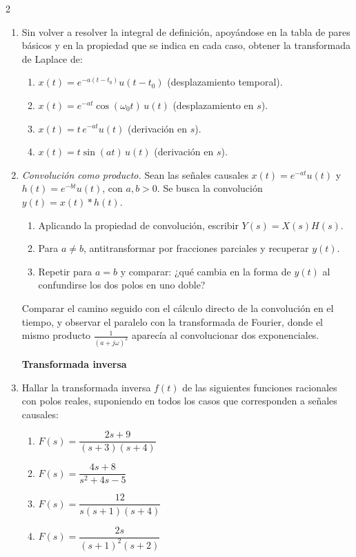 \documentclass[10pt,a4paper]{article}
\begin{document}
\begin{multicols}{2}
\begin{enumerate}
			\textbf{Propiedades}
			\item Sin volver a resolver la integral de definición, apoyándose en la tabla de pares básicos y en la propiedad que se indica en cada caso, obtener la transformada de Laplace de:
			\begin{enumerate}
				\item $x(t) = e^{-a(t-t_0)}u(t-t_0)$ \hfill (desplazamiento temporal).
				\item $x(t) = e^{-at}\cos(\omega_0 t)\,u(t)$ \hfill (desplazamiento en $s$).
				\item $x(t) = t\,e^{-at}u(t)$ \hfill (derivación en $s$).
				\item $x(t) = t\sin(at)\,u(t)$ \hfill (derivación en $s$).
			\end{enumerate}

			\item \emph{Convolución como producto.} Sean las señales causales $x(t) = e^{-at}u(t)$ y $h(t) = e^{-bt}u(t)$, con $a, b > 0$. Se busca la convolución $y(t) = x(t) * h(t)$.
			\begin{enumerate}
				\item Aplicando la propiedad de convolución, escribir $Y(s) = X(s)H(s)$.
				\item Para $a \neq b$, antitransformar por fracciones parciales y recuperar $y(t)$.
				\item Repetir para $a = b$ y comparar: ¿qué cambia en la forma de $y(t)$ al confundirse los dos polos en uno doble?
			\end{enumerate}
			Comparar el camino seguido con el cálculo directo de la convolución en el tiempo, y observar el paralelo con la transformada de Fourier, donde el mismo producto $\frac{1}{(a+j\omega)^2}$ aparecía al convolucionar dos exponenciales.

			\textbf{Transformada inversa}
			\item Hallar la transformada inversa $f(t)$ de las siguientes funciones racionales con polos reales, suponiendo en todos los casos que corresponden a señales causales:
			\begin{enumerate}
				\item $F(s) = \dfrac{2s+9}{(s+3)(s+4)}$
				\item $F(s) = \dfrac{4s+8}{s^2+4s-5}$
				\item $F(s) = \dfrac{12}{s(s+1)(s+4)}$
				\item $F(s) = \dfrac{2s}{(s+1)^2(s+2)}$
			\end{enumerate}


\end{enumerate}
\end{multicols}
\end{document}
